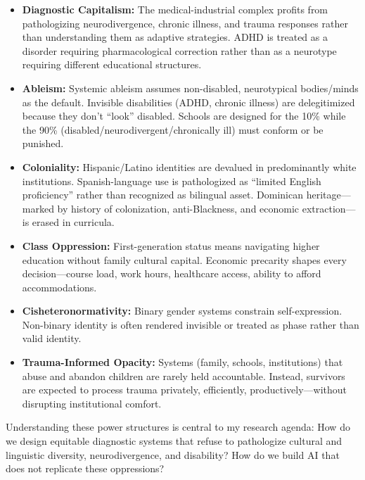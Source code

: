 \documentclass[10pt]{article}
\begin{document}
\begin{itemize}
\item \textbf{Diagnostic Capitalism:} The medical-industrial complex profits from pathologizing neurodivergence, chronic illness, and trauma responses rather than understanding them as adaptive strategies. ADHD is treated as a disorder requiring pharmacological correction rather than as a neurotype requiring different educational structures.

\item \textbf{Ableism:} Systemic ableism assumes non-disabled, neurotypical bodies/minds as the default. Invisible disabilities (ADHD, chronic illness) are delegitimized because they don't ``look'' disabled. Schools are designed for the 10\% while the 90\% (disabled/neurodivergent/chronically ill) must conform or be punished.

\item \textbf{Coloniality:} Hispanic/Latino identities are devalued in predominantly white institutions. Spanish-language use is pathologized as ``limited English proficiency'' rather than recognized as bilingual asset. Dominican heritage---marked by history of colonization, anti-Blackness, and economic extraction---is erased in curricula.

\item \textbf{Class Oppression:} First-generation status means navigating higher education without family cultural capital. Economic precarity shapes every decision---course load, work hours, healthcare access, ability to afford accommodations.

\item \textbf{Cisheteronormativity:} Binary gender systems constrain self-expression. Non-binary identity is often rendered invisible or treated as phase rather than valid identity.

\item \textbf{Trauma-Informed Opacity:} Systems (family, schools, institutions) that abuse and abandon children are rarely held accountable. Instead, survivors are expected to process trauma privately, efficiently, productively---without disrupting institutional comfort.

\end{itemize}

Understanding these power structures is central to my research agenda: How do we design equitable diagnostic systems that refuse to pathologize cultural and linguistic diversity, neurodivergence, and disability? How do we build AI that does not replicate these oppressions?
\end{document}
